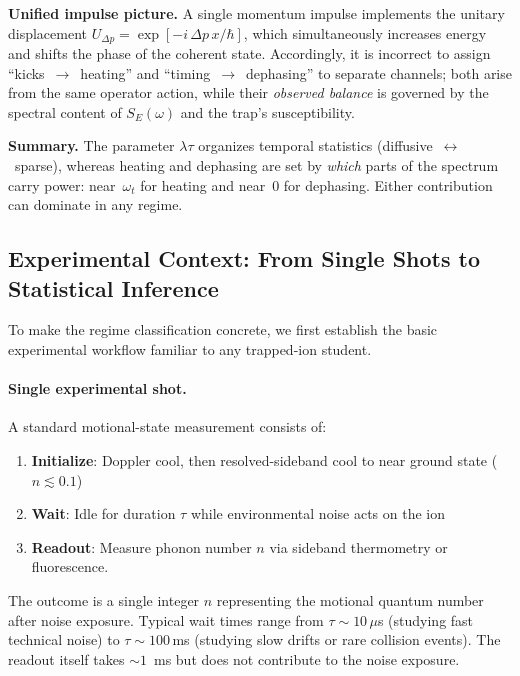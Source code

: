 \noindent\textbf{Unified impulse picture.}
A single momentum impulse implements the unitary displacement
$U_{\Delta p}=\exp[-i\,\Delta p\,x/\hbar]$,
which simultaneously increases energy and shifts the phase of the coherent
state.  Accordingly, it is incorrect to assign ``kicks~$\rightarrow$~heating''
and ``timing~$\rightarrow$~dephasing'' to separate channels; both arise from
the same operator action, while their \emph{observed balance} is governed by
the spectral content of $S_E(\omega)$ and the trap’s susceptibility.

\medskip
\noindent\textbf{Summary.}
The parameter $\lambda\tau$ organizes temporal statistics
(diffusive~$\leftrightarrow$~sparse), whereas heating and dephasing are set by
\emph{which} parts of the spectrum carry power:
near~$\omega_t$ for heating and near~0 for dephasing.
Either contribution can dominate in any regime.

\subsection{Experimental Context: From Single Shots to Statistical Inference}

To make the regime classification concrete, we first establish the basic experimental workflow familiar to any trapped-ion student.

\paragraph{Single experimental shot.}
A standard motional-state measurement consists of:
\begin{enumerate}[nosep]
\item \textbf{Initialize}: Doppler cool, then resolved-sideband cool to near ground state ($n \lesssim 0.1$)
\item \textbf{Wait}: Idle for duration $\tau$ while environmental noise acts on the ion
\item \textbf{Readout}: Measure phonon number $n$ via sideband thermometry or fluorescence.
\end{enumerate}
The outcome is a single integer $n$ representing the motional quantum number after noise exposure. Typical wait times range from $\tau \sim 10\,\mu$s (studying fast technical noise) to $\tau \sim 100\,$ms (studying slow drifts or rare collision events). The readout itself takes $\sim 1$~ms but does not contribute to the noise exposure.

